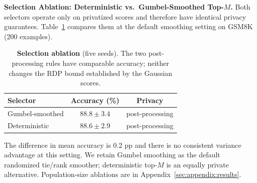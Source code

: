 \noindent\textbf{Selection Ablation: Deterministic vs.\ Gumbel-Smoothed Top-$M$.}\label{sec:em_ablation}
Both selectors operate only on privatized scores and therefore have identical privacy guarantees. Table~\ref{tab:em_ablation} compares them at the default smoothing setting on GSM8K (200 examples).

\begin{table}[t]
\centering
\scriptsize
\setlength{\tabcolsep}{2.5pt}
\begin{tabular}{lcc}
\toprule
\textbf{Selector} & \textbf{Accuracy (\%)} & \textbf{Privacy} \\
\midrule
Gumbel-smoothed & $88.8\pm3.4$ & post-processing \\
Deterministic & $88.6\pm2.9$ & post-processing \\
\bottomrule
\end{tabular}
\caption{\textbf{Selection ablation} (five seeds). The two post-processing rules have comparable accuracy; neither changes the RDP bound established by the Gaussian scores.}
\label{tab:em_ablation}
\end{table}

\noindent The difference in mean accuracy is 0.2 pp and there is no consistent variance advantage at this setting. We retain Gumbel smoothing as the default randomized tie/rank smoother; deterministic top-$M$ is an equally private alternative. Population-size ablations are in Appendix~\ref{sec:appendix:results}.

